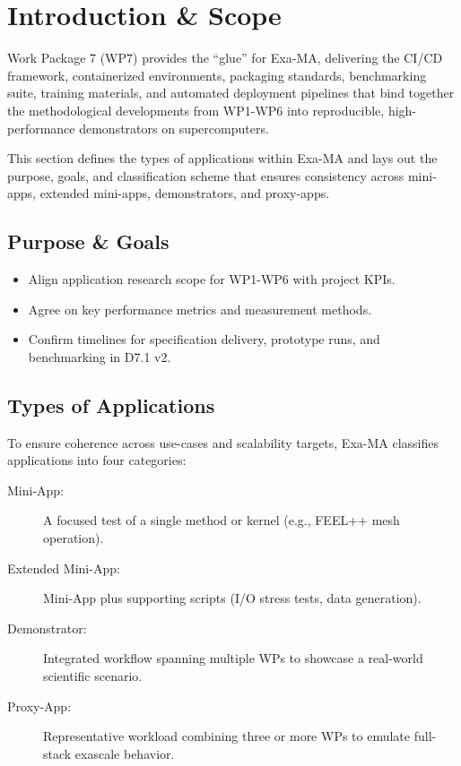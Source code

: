 
\section{Introduction \& Scope}
\label{sec:apps-intro}

Work Package 7 (WP7) provides the “glue” for Exa-MA, delivering the CI/CD framework, containerized environments, packaging standards, benchmarking suite, training materials, and automated deployment pipelines that bind together the methodological developments from WP1-WP6 into reproducible, high-performance demonstrators on supercomputers.

This section defines the types of applications within Exa-MA and lays out the purpose, goals, and classification scheme that ensures consistency across mini-apps, extended mini-apps, demonstrators, and proxy-apps.

\subsection{Purpose \& Goals}
\begin{itemize}
  \item Align application research scope for WP1-WP6 with project KPIs.
  \item Agree on key performance metrics and measurement methods.
  \item Confirm timelines for specification delivery, prototype runs, and benchmarking in D7.1 v2.
\end{itemize}

\subsection{Types of Applications}
To ensure coherence across use-cases and scalability targets, Exa-MA classifies applications into four categories:
\begin{description}
  \item[Mini-App:] A focused test of a single method or kernel (e.g., FEEL++ mesh operation).
  \item[Extended Mini-App:] Mini-App plus supporting scripts (I/O stress tests, data generation).
  \item[Demonstrator:] Integrated workflow spanning multiple WPs to showcase a real-world scientific scenario.
  \item[Proxy-App:] Representative workload combining three or more WPs to emulate full-stack exascale behavior.
\end{description}